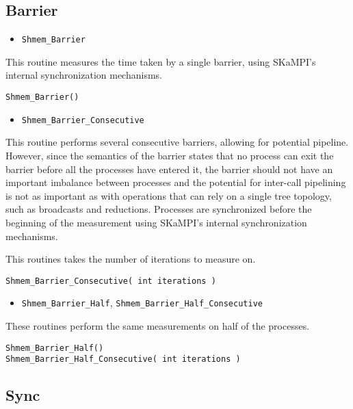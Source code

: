 \documentclass[12pt, letterpaper]{article}
\begin{document}
\subsection{Barrier}

\begin{itemize}
    \item {\tt Shmem\_Barrier}
\end{itemize}

This routine measures the time taken by a single barrier, using SKaMPI's internal synchronization mechanisms. 

\begin{lstlisting}
Shmem_Barrier()
\end{lstlisting}

\begin{itemize}
    \item {\tt Shmem\_Barrier\_Consecutive}
\end{itemize}

This routine performs several consecutive barriers, allowing for potential pipeline. However, since the semantics of the barrier states that no process can exit the barrier before all the processes have entered it, the barrier should not have an important imbalance between processes and the potential for inter-call pipelining is not as important as with operations that can rely on a single tree topology, such as broadcasts and reductions. Processes are synchronized before the beginning of the measurement using SKaMPI's internal synchronization mechanisms. 

 This routines takes the number of iterations to measure on.

\begin{lstlisting}
Shmem_Barrier_Consecutive( int iterations )
\end{lstlisting}

\begin{itemize}
    \item {\tt Shmem\_Barrier\_Half}, {\tt Shmem\_Barrier\_Half\_Consecutive}
\end{itemize}

These routines perform the same measurements on half of the processes.

\begin{lstlisting}
Shmem_Barrier_Half()
Shmem_Barrier_Half_Consecutive( int iterations )
\end{lstlisting}

\subsection{Sync}
\end{document}
